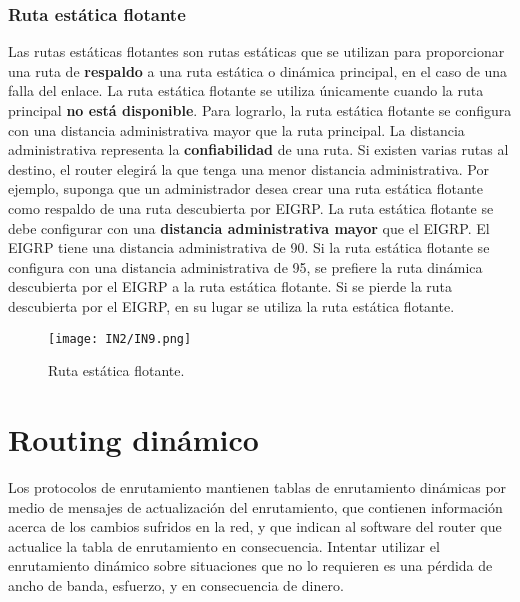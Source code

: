 \documentclass[
	12pt, %
	fleqn, %
	a4paper, %
	oneside, %
]{LegrandOrangeBook}
\begin{document}
\subsubsection*{Ruta estática flotante}
Las rutas estáticas flotantes son rutas estáticas que se utilizan para proporcionar una ruta de \textbf{respaldo} a una ruta estática o dinámica principal, en el caso de una falla del enlace. La ruta estática flotante se utiliza únicamente cuando la ruta principal \textbf{no está disponible}. Para lograrlo, la ruta estática flotante se configura con una distancia administrativa mayor que la ruta principal. La distancia administrativa representa la \textbf{confiabilidad} de una ruta. Si existen varias rutas al destino, el router elegirá la que tenga una menor distancia administrativa. Por ejemplo, suponga que un administrador desea crear una ruta estática flotante como respaldo de una ruta descubierta por EIGRP. La ruta estática flotante se debe configurar con una \textbf{distancia administrativa mayor} que el EIGRP. El EIGRP tiene una distancia administrativa de 90. Si la ruta estática flotante se configura con una distancia administrativa de 95, se prefiere la ruta dinámica descubierta por el EIGRP a la ruta estática flotante. Si se pierde la ruta descubierta por el EIGRP, en su lugar se utiliza la ruta estática flotante.
\begin{figure}[H]
\centering
\texttt{[image: IN2/IN9.png]}
\caption{Ruta estática flotante.}
\end{figure}
\section{Routing dinámico}
Los protocolos de enrutamiento mantienen tablas de enrutamiento dinámicas por medio de mensajes de actualización del enrutamiento, que contienen información acerca de los cambios sufridos en la red, y que indican al software del router que actualice la tabla de enrutamiento en consecuencia. Intentar utilizar el enrutamiento dinámico sobre situaciones que no lo requieren es una pérdida de ancho de banda, esfuerzo, y en consecuencia de dinero. 
\end{document}
